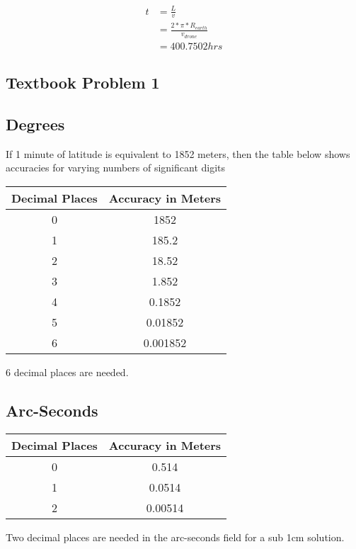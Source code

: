 \documentclass[]{article}
\begin{document}
\begin{align*}
	t &= \frac{L}{v} \\
	&= \frac{2 * \pi * R_{earth}}{v_{drone}} \\
	&= 400.7502 hrs
\end{align*}

\subsection{Textbook Problem 1}

\subsection{Degrees}

If 1 minute of latitude is equivalent to 1852 meters, then the table below shows accuracies for varying numbers of significant digits

\begin{center}
	\begin{tabular}{|c|c|} \hline
		Decimal Places & Accuracy in Meters \\ \hline
		0 & 1852 \\
		1 & 185.2 \\
		2 & 18.52 \\
		3 & 1.852 \\
		4 & 0.1852 \\
		5 & 0.01852 \\
		6 & 0.001852 \\ \hline
	\end{tabular}
\end{center}

6 decimal places are needed.

\subsection{Arc-Seconds}

\begin{center}
	\begin{tabular}{|c|c|} \hline
		Decimal Places & Accuracy in Meters \\ \hline
		0 & 0.514 \\
		1 & 0.0514 \\
		2 & 0.00514 \\ \hline
	\end{tabular}
\end{center}

Two decimal places are needed in the arc-seconds field for a sub 1cm solution.
\end{document}
